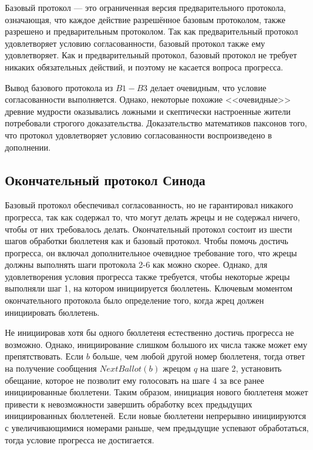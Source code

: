 \documentclass[12pt, a4paper]{article} %
\begin{document}
Базовый протокол --- это ограниченная версия предварительного протокола, означающая, что каждое действие разрешённое базовым протоколом, также разрешено и предварительным протоколом. Так как предварительный протокол удовлетворяет условию согласованности, базовый протокол также ему удовлетворяет. Как и предварительный протокол, базовый протокол не требует никаких обязательных действий, и поэтому не касается вопроса прогресса.

Вывод базового протокола из $B1 - B3$ делает очевидным, что условие согласованности выполняется. Однако, некоторые похожие <<очевидные>> древние мудрости оказывались ложными и скептически настроенные жители потребовали строгого доказательства. Доказательство математиков паксонов того, что протокол удовлетворяет условию согласованности воспроизведено в дополнении.

\subsection{Окончательный протокол Синода}\label{sec:completeprot}

Базовый протокол обеспечивал согласованность, но не гарантировал никакого прогресса, так как содержал то, что могут делать жрецы и не содержал ничего, чтобы от них требовалось делать. Окончательный протокол состоит из шести шагов обработки бюллетеня как и базовый протокол. Чтобы помочь достичь прогресса, он включал дополнительное очевидное требование того, что жрецы должны выполнять шаги протокола 2-6 как можно скорее. Однако, для удовлетворения условия прогресса также требуется, чтобы некоторые жрецы выполняли шаг 1, на котором инициируется бюллетень. Ключевым  моментом окончательного протокола было определение того, когда жрец должен инициировать бюллетень.

Не инициировав хотя бы одного бюллетеня естественно достичь прогресса не возможно. Однако, инициирование слишком большого их числа также может ему препятствовать. Если $b$ больше, чем любой другой номер бюллетеня, тогда ответ на получение сообщения $NextBallot(b)$  жрецом $q$ на шаге 2, установить обещание, которое не позволит ему голосовать на шаге 4 за все ранее инициированные бюллетени. Таким образом, инициация нового бюллетеня может привести к невозможности завершить обработку всех предыдущих инициированных бюллетеней. Если новые бюллетени непрерывно инициируются с увеличивающимися номерами раньше, чем предыдущие успевают обработаться, тогда условие прогресса не достигается.
\end{document}
